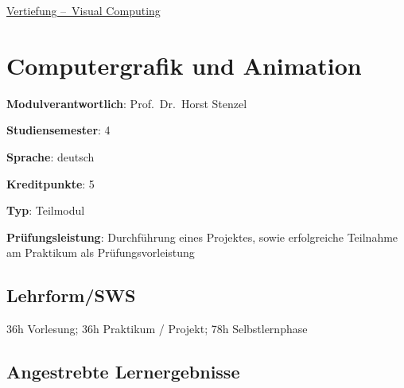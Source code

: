 \hyperref[/mi-2017/modulbeschreibungen-bachelor/BA_Vertiefung-Visual-Computing]{Vertiefung – Visual Computing}

\hypertarget{computergrafik-und-animationpathlabelmi-2017modulbeschreibungen-bachelorba_vc-computergrafik-und-animation}{%
\chapter{Computergrafik und
Animation\label{/mi-2017/modulbeschreibungen-bachelor/BA_VC-computergrafik-und-animation}}\label{computergrafik-und-animationpathlabelmi-2017modulbeschreibungen-bachelorba_vc-computergrafik-und-animation}}

\begin{modulHead}
\textbf{Modulverantwortlich}: Prof.~Dr.~Horst
Stenzel
\end{modulHead}
\begin{modulHead}
\textbf{Studiensemester}:
4
\end{modulHead}
\begin{modulHead}
\textbf{Sprache}:
deutsch
\end{modulHead}
\begin{modulHead}
\textbf{Kreditpunkte}:
5
\end{modulHead}
\begin{modulHead}
\textbf{Typ}:
Teilmodul
\end{modulHead}
\begin{modulHead}
\textbf{Prüfungsleistung}:
Durchführung eines Projektes, sowie erfolgreiche Teilnahme am Praktikum
als Prüfungsvorleistung
\end{modulHead}


\hypertarget{lehrformswspathlabelmi-2017modulbeschreibungen-bachelorba_vc-computergrafik-und-animation}{%
\section*{Lehrform/SWS\label{/mi-2017/modulbeschreibungen-bachelor/BA_VC-computergrafik-und-animation}}\label{lehrformswspathlabelmi-2017modulbeschreibungen-bachelorba_vc-computergrafik-und-animation}}

36h Vorlesung; 36h Praktikum / Projekt; 78h Selbstlernphase

\hypertarget{angestrebte-lernergebnissepathlabelmi-2017modulbeschreibungen-bachelorba_vc-computergrafik-und-animation}{%
\section*{Angestrebte
Lernergebnisse\label{/mi-2017/modulbeschreibungen-bachelor/BA_VC-computergrafik-und-animation}}\label{angestrebte-lernergebnissepathlabelmi-2017modulbeschreibungen-bachelorba_vc-computergrafik-und-animation}}

